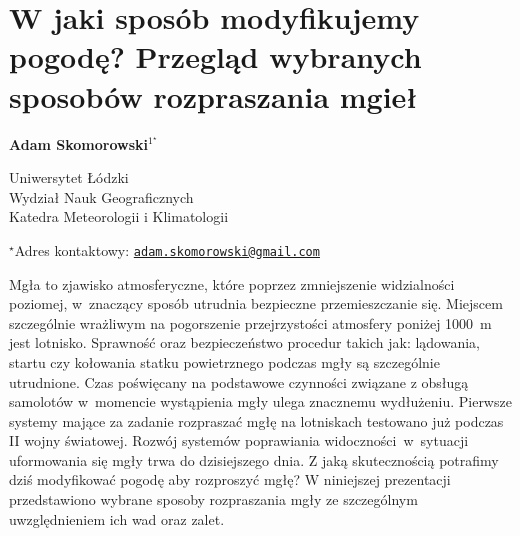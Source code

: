 \documentclass[\main/boa.tex]{subfiles}
\begin{document}
\sloppy


\section{W jaki sposób modyfikujemy pogodę? Przegląd wybranych sposobów rozpraszania mgieł}

\begin{center}
  {\bf {} Adam Skomorowski$^{1^\star}$}
\end{center}

\vskip 0.3cm

\begin{affiliations}
\begin{enumerate}
\begin{minipage}{0.915\textwidth}
\centering
\item Uniwersytet Łódzki \\ Wydział Nauk Geograficznych \\ Katedra Meteorologii i Klimatologii\\[-2pt]
\end{minipage}
\end{enumerate}
$^\star$Adres kontaktowy: \href{mailto:adam.skomorowski@gmail.com}{\nolinkurl{adam.skomorowski@gmail.com}}\\
\end{affiliations}

\vskip 0.5cm


\vskip 0.5cm

Mgła to zjawisko atmosferyczne, które poprzez zmniejszenie widzialności poziomej, w znaczący sposób utrudnia bezpieczne przemieszczanie się. Miejscem szczególnie wrażliwym na pogorszenie przejrzystości atmosfery poniżej 1000~m jest lotnisko. Sprawność oraz bezpieczeństwo procedur takich jak: lądowania, startu czy kołowania statku powietrznego podczas mgły są szczególnie utrudnione. Czas poświęcany na podstawowe czynności związane z obsługą samolotów w momencie wystąpienia mgły ulega znacznemu wydłużeniu. Pierwsze systemy mające za zadanie rozpraszać mgłę na lotniskach testowano już podczas II wojny światowej. Rozwój systemów poprawiania widoczności~w~sytuacji uformowania się mgły trwa do dzisiejszego dnia. Z jaką skutecznością potrafimy dziś modyfikować pogodę aby rozproszyć mgłę? W niniejszej prezentacji przedstawiono wybrane sposoby rozpraszania mgły ze szczególnym uwzględnieniem ich wad oraz zalet.
\end{document}
